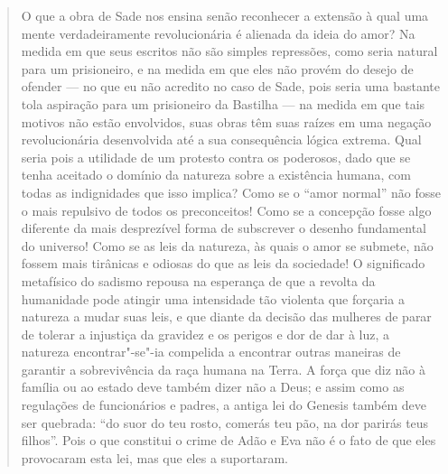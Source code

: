 \begin{quote}
O que a obra de Sade nos ensina senão reconhecer a extensão à qual uma
mente verdadeiramente revolucionária é alienada da ideia do amor? Na
medida em que seus escritos não são simples repressões, como seria
natural para um prisioneiro, e na medida em que eles não provém do
desejo de ofender --- no que eu não acredito no caso de Sade, pois seria
uma bastante tola aspiração para um prisioneiro da Bastilha --- na medida
em que tais motivos não estão envolvidos, suas obras têm suas raízes em
uma negação revolucionária desenvolvida até a sua consequência lógica
extrema. Qual seria pois a utilidade de um protesto contra os poderosos,
dado que se tenha aceitado o domínio da natureza sobre a existência
humana, com todas as indignidades que isso implica? Como se o ``amor
normal'' não fosse o mais repulsivo de todos os preconceitos! Como se a
concepção fosse algo diferente da mais desprezível forma de subscrever o
desenho fundamental do universo! Como se as leis da natureza, às quais o
amor se submete, não fossem mais tirânicas e odiosas do que as leis da
sociedade! O significado metafísico do sadismo repousa na esperança de
que a revolta da humanidade pode atingir uma intensidade tão violenta
que forçaria a natureza a mudar suas leis, e que diante da decisão das
mulheres de parar de tolerar a injustiça da gravidez e os perigos e dor
de dar à luz, a natureza encontrar"-se"-ia compelida a encontrar outras
maneiras de garantir a sobrevivência da raça humana na Terra. A força
que diz não à família ou ao estado deve também dizer não a Deus; e assim
como as regulações de funcionários e padres, a antiga lei do Genesis
também deve ser quebrada: ``do suor do teu rosto, comerás teu pão, na
dor parirás teus filhos''. Pois o que constitui o crime de Adão e Eva
não é o fato de que eles provocaram esta lei, mas que eles a suportaram.
\end{quote}

